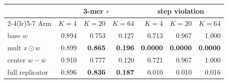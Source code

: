 \begin{tabular}{lrrrrrr}
\toprule
& \multicolumn{3}{c}{3-mer $r$} & \multicolumn{3}{c}{step violation} \\
\cmidrule(lr){2-4}\cmidrule(lr){5-7}
Arm & $K{=}4$ & $K{=}20$ & $K{=}64$ & $K{=}4$ & $K{=}20$ & $K{=}64$ \\
\midrule
base $w$ & 0.894 & 0.753 & 0.127 & 0.713 & 0.967 & 1.000 \\
mult $x \odot w$ & 0.899 & \textbf{0.865} & \textbf{0.196} & \textbf{0.0000} & \textbf{0.0000} & \textbf{0.0000} \\
center $w - \bar{w}$ & 0.910 & 0.777 & 0.120 & 0.721 & 0.967 & 1.000 \\
full replicator & 0.896 & \textbf{0.836} & \textbf{0.187} & 0.010 & 0.010 & 0.016 \\
\bottomrule
\end{tabular}